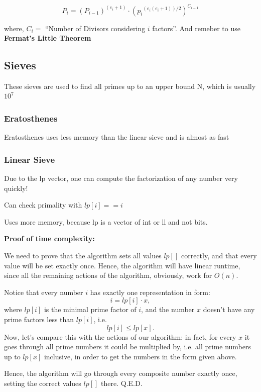 	$$ P_i = (P_{i-1})^{(e_i + 1)} \cdot ({p_i}^{(e_i(e_i + 1))/2})^{C_{i-1}} $$
	
	where, $ C_i = $ ``Number of Divisors considering $i$ factors''.
	And remeber to use \textbf{Fermat's Little Theorem}
	
\subsection{Sieves}
	
	These sieves are used to find all primes up to an upper bound N, which is usually $10^7$

	\subsubsection{Eratosthenes}

		Eratosthenes uses less memory than the linear sieve and is almost as fast


	\subsubsection{Linear Sieve}

		Due to the lp vector, one can compute the factorization of any number very quickly!

		Can check primality with $lp[i] == i$

		Uses more memory, because lp is a vector of int or ll and not bits.

		\textbf{Proof of time complexity:}

		We need to prove that the algorithm sets all values
		$lp[]$ correctly, and that every value will be set exactly once. 
		Hence, the algorithm will have linear runtime, since all the remaining actions of the algorithm, obviously, work for
		$O(n)$.

		Notice that every number $i$ has exactly one representation in form:
		$$i = lp [i] \cdot x,$$
		where 
		$lp [i]$ is the minimal prime factor of 
		$i$, and the number 
		$x$ doesn't have any prime factors less than 
		$lp [i]$, i.e.
		$$lp [i] \le lp [x].$$
		Now, let's compare this with the actions of our algorithm: in fact, for every 
		$x$ it goes through all prime numbers it could be multiplied by, i.e. all prime numbers up to 
		$lp [x]$ inclusive, in order to get the numbers in the form given above.

		Hence, the algorithm will go through every composite number exactly once, setting the correct values 
		$lp []$ there. Q.E.D.

